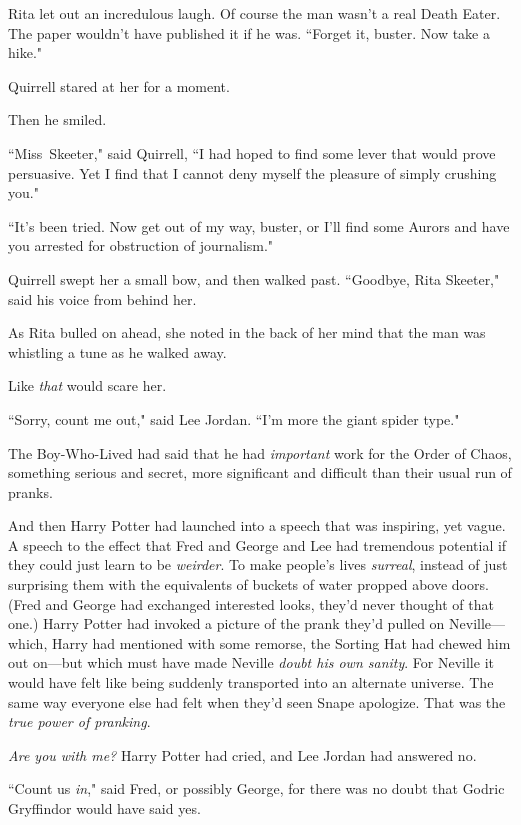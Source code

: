 Rita let out an incredulous laugh. Of course the man wasn't a real Death Eater. The paper wouldn't have published it if he was. ``Forget it, buster. Now take a hike."

Quirrell stared at her for a moment.

Then he smiled.

``Miss~Skeeter," said Quirrell, ``I had hoped to find some lever that would prove persuasive. Yet I find that I cannot deny myself the pleasure of simply crushing you."

``It's been tried. Now get out of my way, buster, or I'll find some Aurors and have you arrested for obstruction of journalism."

Quirrell swept her a small bow, and then walked past. ``Goodbye, Rita Skeeter," said his voice from behind her.

As Rita bulled on ahead, she noted in the back of her mind that the man was whistling a tune as he walked away.

Like \emph{that} would scare her.


``Sorry, count me out," said Lee Jordan. ``I'm more the giant spider type."

The Boy-Who-Lived had said that he had \emph{important} work for the Order of Chaos, something serious and secret, more significant and difficult than their usual run of pranks.

And then Harry Potter had launched into a speech that was inspiring, yet vague. A speech to the effect that Fred and George and Lee had tremendous potential if they could just learn to be \emph{weirder}. To make people's lives \emph{surreal}, instead of just surprising them with the equivalents of buckets of water propped above doors. (Fred and George had exchanged interested looks, they'd never thought of that one.) Harry Potter had invoked a picture of the prank they'd pulled on Neville—which, Harry had mentioned with some remorse, the Sorting Hat had chewed him out on—but which must have made Neville \emph{doubt his own sanity}. For Neville it would have felt like being suddenly transported into an alternate universe. The same way everyone else had felt when they'd seen Snape apologize. That was the \emph{true power of pranking}.

\emph{Are you with me?} Harry Potter had cried, and Lee Jordan had answered no.

``Count us \emph{in}," said Fred, or possibly George, for there was no doubt that Godric Gryffindor would have said yes.


